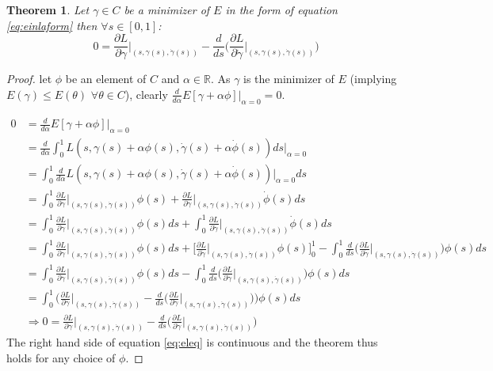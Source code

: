 \documentclass{article}
\newcommand{\R}{\mathds{R}}
\newtheorem{thm}{Theorem}
\begin{document}
					\begin{thm} \label{th:el}
						Let $\gamma \in C$ be a minimizer of $E$ in the form of equation \ref{eq:einlaform} then $\forall s \in [0,1]$:
						\begin{equation} \label{eq:eleq}
							0 = \frac{\partial L}{\partial \gamma}\biggr\rvert_{(s,\gamma(s),\dot\gamma(s))}-\frac{d}{ds}\Bigg(\frac{\partial L}{\partial \dot\gamma}\biggr\rvert_{(s,\gamma(s),\dot\gamma(s))}\Bigg)
						\end{equation}
					\end{thm}
					
					\begin{proof}
						let $\phi$ be an element of $C$ and $\alpha\in\R$. As $\gamma$ is the minimizer of $E$ (implying $E(\gamma)\leq E(\theta)$ $\forall \theta\in C$), clearly $\frac{d}{d\alpha}E[\gamma + \alpha\phi]\rvert_{\alpha=0}=0$.

						\begin{align*}
							0 &= \frac{d}{d\alpha}E[\gamma + \alpha\phi]\rvert_{\alpha=0}\\
							&= \frac{d}{d\alpha}\int_0^1{L(s,\gamma(s) + \alpha\phi(s),\dot\gamma(s)+\alpha\dot\phi(s))ds}\biggr\rvert_{\alpha=0}\\
							&= \int_0^1{\frac{d}{d\alpha}L(s,\gamma(s) + \alpha\phi(s),\dot\gamma(s)+\alpha\dot\phi(s))\biggr\rvert_{\alpha=0}ds}\\
							&= \int_0^1{\frac{\partial L}{\partial \gamma}\biggr\rvert_{(s,\gamma(s),\dot\gamma(s))}\phi(s) + \frac{\partial L}{\partial \dot\gamma}\biggr\rvert_{(s,\gamma(s),\dot\gamma(s))}\dot\phi(s)ds}\\
							&= \int_0^1{\frac{\partial L}{\partial \gamma}\biggr\rvert_{(s,\gamma(s),\dot\gamma(s))}\phi(s)ds}+\int_0^1{\frac{\partial L}{\partial \dot\gamma}\biggr\rvert_{(s,\gamma(s),\dot\gamma(s))}\dot\phi(s)ds}\\
							&= \int_0^1{\frac{\partial L}{\partial \gamma}\biggr\rvert_{(s,\gamma(s),\dot\gamma(s))}\phi(s)ds} + \bigg[\frac{\partial L}{\partial \dot\gamma}\biggr\rvert_{(s,\gamma(s),\dot\gamma(s))}\phi(s)\bigg]_0^1 - \int_0^1{\frac{d}{ds}\bigg(\frac{\partial L}{\partial \dot\gamma}\biggr\rvert_{(s,\gamma(s),\dot\gamma(s))}\bigg)\phi(s)ds}\\
							&= \int_0^1{\frac{\partial L}{\partial \gamma}\biggr\rvert_{(s,\gamma(s),\dot\gamma(s))}\phi(s)ds} - \int_0^1{\frac{d}{ds}\bigg(\frac{\partial L}{\partial \dot\gamma}\biggr\rvert_{(s,\gamma(s),\dot\gamma(s))}\bigg)\phi(s)ds}\\
							&= \int_0^1{\bigg(\frac{\partial L}{\partial \gamma}\biggr\rvert_{(s,\gamma(s),\dot\gamma(s))} - \frac{d}{ds}\bigg(\frac{\partial L}{\partial \dot\gamma}\biggr\rvert_{(s,\gamma(s),\dot\gamma(s))}\bigg)\bigg)\phi(s)ds}\\
							&\Rightarrow 0 = \frac{\partial L}{\partial \gamma}\biggr\rvert_{(s,\gamma(s),\dot\gamma(s))} - \frac{d}{ds}\bigg(\frac{\partial L}{\partial \dot\gamma}\biggr\rvert_{(s,\gamma(s),\dot\gamma(s))}\bigg)
						\end{align*}
						The right hand side of equation \ref{eq:eleq} is continuous and the theorem thus holds for any choice of $\phi$.

					\end{proof}
\end{document}
